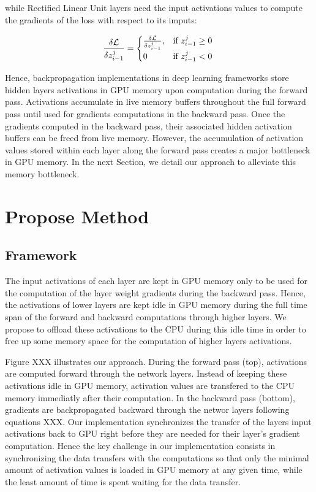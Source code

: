 \documentclass[11pt,onecolumn]{article}
\begin{document}
while Rectified Linear Unit layers need the input activations values 
to compute the gradients of the loss with respect to its imputs:

\begin{equation}
\frac{\delta \mathcal{L}}{\delta z_{i-1}^j}  = \begin{cases}
\frac{\delta \mathcal{L}}{\delta z_{i-1}^j}, & \text{if}\ z_{i-1}^j \geq 0 \\
0 & \text{if}\ z_{i-1}^j < 0
\end{cases} \\
\end{equation}

Hence, backpropagation implementations in deep learning frameworks
store hidden layers activations in GPU memory 
upon computation during the forward pass. 
Activations accumulate in live memory buffers throughout the full forward pass
until used for gradients computations in the backward pass. 
Once the gradients computed in the backward pass, 
their associated hidden activation buffers can be freed from live memory. 
However, the accumulation of activation values stored within each layer 
along the forward pass creates a major bottleneck in GPU memory.
In the next Section, we detail our approach to alleviate this memory bottleneck.

\section{Propose Method}
\subsection{Framework}

The input activations of each layer are kept in GPU memory only to be used for the
computation of the layer weight gradients during the backward pass. 
Hence, the activations of lower layers are kept idle in GPU memory during the
full time span of the forward and backward computations through higher layers.
We propose to offload these activations to the CPU during this idle time
in order to free up some memory space for the computation of higher layers activations.

Figure XXX illustrates our approach. 
During the forward pass (top), activations are computed forward through the network layers.
Instead of keeping these activations idle in GPU memory, activation values are transfered to 
the CPU memory immediatly after their computation.
In the backward pass (bottom), gradients are backpropagated backward 
through the networ layers following equations XXX.
Our implementation synchronizes the transfer of the layers input activations back to GPU
right before they are needed for their layer's gradient computation.
Hence the key challenge in our implementation consists in synchronizing the data
transfers with the computations so that only the minimal amount of activation values 
is loaded in GPU memory at any given time, while the least amount of time is spent 
waiting for the data transfer.
\end{document}
